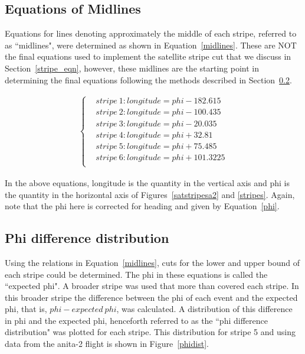 \subsection{Equations of Midlines}

Equations for lines denoting approximately the middle of each stripe, referred to as ``midlines", were determined as shown in Equation~\ref{midlines}. These are NOT the final equations used to implement the satellite stripe cut that we discuss in Section~\ref{stripe_eqn}, however, these midlines are the starting point in determining the final equations following the methods described in Section~\ref{sat_method}. 

\begin{align}
\begin{cases}
& stripe~1: longitude = phi -182.615 \\
& stripe~2: longitude = phi -100.435 \\
& stripe~3: longitude = phi -20.035 \\
& stripe~4: longitude = phi +32.81 \\
& stripe~5: longitude = phi +75.485 \\
& stripe~6: longitude = phi +101.3225 \\
\end{cases}
\label{midlines}
\end{align} 

\bigskip

In the above equations, longitude is the quantity in the vertical axis and phi is the quantity in the horizontal axis of Figures~\ref{satstripesa2} and \ref{stripes}. Again, note that the phi here is corrected for heading and given by Equation~\ref{phi}.

\subsection{Phi difference distribution}
\label{sat_method}

Using the relations in Equation~\ref{midlines}, cuts for the lower and upper bound of each stripe could be determined.
The phi in these equations is called the ``expected phi". 
A broader stripe was used that more than covered each stripe. In this broader stripe the difference between the phi of each event and the expected phi, that is, $phi - expected~phi$, was calculated. A distribution of this difference in phi and the expected phi, henceforth referred to as the ``phi difference distribution" was plotted for each stripe. This distribution for stripe 5 and using data from the \gls{anita}-2 flight is shown in Figure~\ref{phidist}. 

